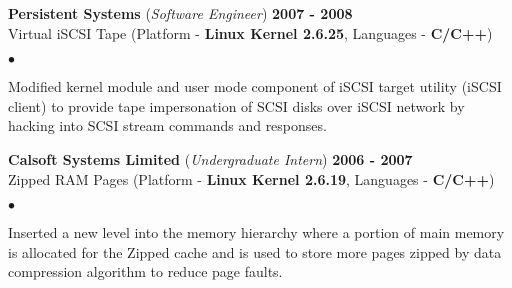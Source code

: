 \documentclass[margin,line]{res}
\newenvironment{list2}{
  \begin{list}{$\bullet$}{%
      \setlength{\itemsep}{0.05in}
      \setlength{\parsep}{0in} \setlength{\parskip}{0in}
      \setlength{\topsep}{0in} \setlength{\partopsep}{0in} 
      \setlength{\leftmargin}{0.2in}}}{\end{list}}
\begin{document}
\begin{resume}
{\bf Persistent Systems} ({\em Software Engineer}) \hfill {\bf 2007 - 2008}\\
Virtual iSCSI Tape (Platform - {\bf Linux Kernel 2.6.25}, Languages - {\bf C/C++})
\begin{list2}
\item Modified kernel module and user mode component of iSCSI target utility (iSCSI client) to provide 
tape impersonation of SCSI disks over iSCSI network by hacking into SCSI stream commands and responses.
\end{list2}

{\bf Calsoft Systems Limited} ({\em Undergraduate Intern}) \hfill {\bf 2006 - 2007}\\
Zipped RAM Pages (Platform - {\bf Linux Kernel 2.6.19}, Languages - {\bf C/C++})
\begin{list2}
\item Inserted a new level into the memory hierarchy where a portion of main memory is allocated for the Zipped cache 
and is used to store more pages zipped by data compression algorithm to reduce page faults.
\end{list2}

%
%


\end{resume}
\end{document}
